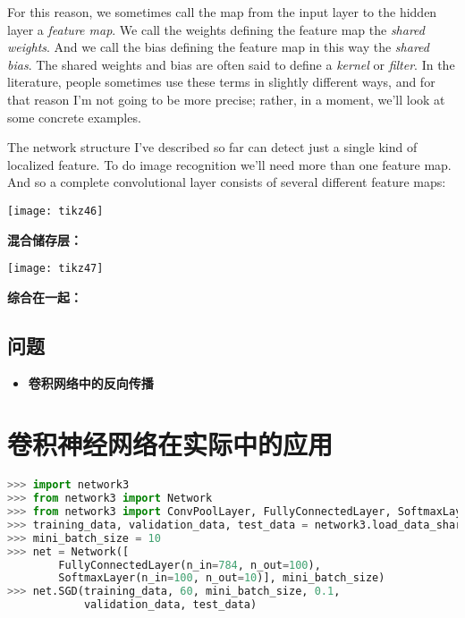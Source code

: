 For this reason, we sometimes call the map from the input layer to the hidden
layer a \emph{feature map}. We call the weights defining the feature map the
\emph{shared weights}. And we call the bias defining the feature map in this way
the \emph{shared bias}. The shared weights and bias are often said to define a
\emph{kernel} or \emph{filter}. In the literature, people sometimes use these
terms in slightly different ways, and for that reason I'm not going to be more
precise; rather, in a moment, we'll look at some concrete examples.

The network structure I've described so far can detect just a single kind of
localized feature. To do image recognition we'll need more than one feature
map. And so a complete convolutional layer consists of several different feature
maps:

\begin{center}
  \texttt{[image: tikz46]}
\end{center}

\textbf{混合储存层：}

\begin{center}
  \texttt{[image: tikz47]}
\end{center}

\textbf{综合在一起：}

\subsection*{问题}

\begin{itemize}
  \item \textbf{卷积网络中的反向传播}\quad 
\end{itemize}

\section{卷积神经网络在实际中的应用}
\label{seq:convolutional_neural_networks_in_practice}

\begin{lstlisting}[language=Python]
>>> import network3
>>> from network3 import Network
>>> from network3 import ConvPoolLayer, FullyConnectedLayer, SoftmaxLayer
>>> training_data, validation_data, test_data = network3.load_data_shared()
>>> mini_batch_size = 10
>>> net = Network([
        FullyConnectedLayer(n_in=784, n_out=100),
        SoftmaxLayer(n_in=100, n_out=10)], mini_batch_size)
>>> net.SGD(training_data, 60, mini_batch_size, 0.1, 
            validation_data, test_data)
\end{lstlisting}

